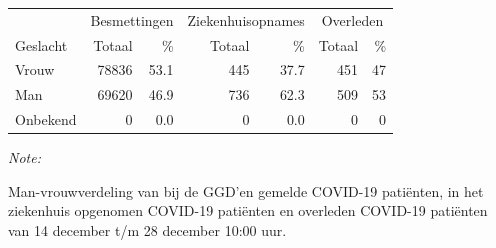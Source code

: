 \documentclass[
  english,
  man,floatsintext]{apa6}
\begin{document}
\begin{table}[H]
\centering\begingroup\fontsize{11}{13}\selectfont

\begin{threeparttable}
\begin{tabular}{lrrrrrr}
\toprule
\multicolumn{1}{c}{ } & \multicolumn{2}{c}{Besmettingen} & \multicolumn{2}{c}{Ziekenhuisopnames} & \multicolumn{2}{c}{Overleden} \\
\cmidrule(l{3pt}r{3pt}){2-3} \cmidrule(l{3pt}r{3pt}){4-5} \cmidrule(l{3pt}r{3pt}){6-7}
Geslacht & Totaal & \% & Totaal & \% & Totaal & \%\\
\midrule
Vrouw & 78836 & 53.1 & 445 & 37.7 & 451 & 47\\
Man & 69620 & 46.9 & 736 & 62.3 & 509 & 53\\
Onbekend & 0 & 0.0 & 0 & 0.0 & 0 & 0\\
\bottomrule
\end{tabular}
\begin{tablenotes}
\item \textit{Note: } 
\item Man-vrouwverdeling van bij de GGD’en gemelde COVID-19 patiënten, in het ziekenhuis opgenomen COVID-19 patiënten en overleden COVID-19 patiënten van 14 december t/m 28 december 10:00 uur.
\end{tablenotes}
\end{threeparttable}
\endgroup{}
\end{table}
\newpage
\end{document}
